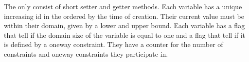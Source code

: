 The   only consist of short setter and getter methods. Each variable has a unique increasing id in the 
ordered by the time of creation. Their current value must be within their domain, given by a lower and 
upper bound. Each variable has a flag that tell if the domain size of the variable is equal to one and a flag that 
tell if it is defined by a oneway constraint. They have a counter for the number of constraints and oneway constraints 
they participate in. \\ 

